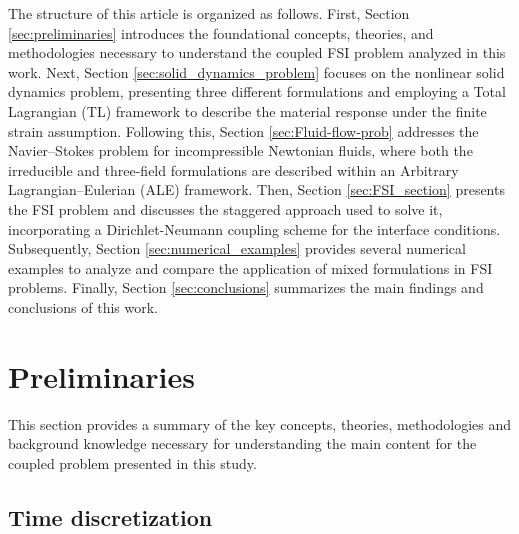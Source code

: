 \documentclass[11pt,english]{article}
\begin{document}
The structure of this article is organized as follows. First, Section \ref{sec:preliminaries} introduces the foundational concepts, theories, and methodologies necessary to understand the coupled FSI problem analyzed in this work. Next, Section \ref{sec:solid_dynamics_problem} focuses on the nonlinear solid dynamics problem, presenting three different formulations and employing a Total Lagrangian (TL) framework to describe the material response under the finite strain assumption. Following this, Section \ref{sec:Fluid-flow-prob} addresses the Navier–Stokes problem for incompressible Newtonian fluids, where both the irreducible and three-field formulations are described within an Arbitrary Lagrangian–Eulerian (ALE) framework. Then, Section \ref{sec:FSI_section} presents the FSI problem and discusses the staggered approach used to solve it, incorporating a Dirichlet-Neumann coupling scheme for the interface conditions. Subsequently, Section \ref{sec:numerical_examples} provides several numerical examples to analyze and compare the application of mixed formulations in FSI problems. Finally, Section \ref{sec:conclusions} summarizes the main findings and conclusions of this work.

%
%

\section{Preliminaries\label{sec:preliminaries}}
This section provides a summary of the key concepts, theories, methodologies and background knowledge necessary for understanding the main content for the coupled problem presented in this study.

\subsection{Time discretization\label{subsec:preliminaries_timediscretization}}
\end{document}
